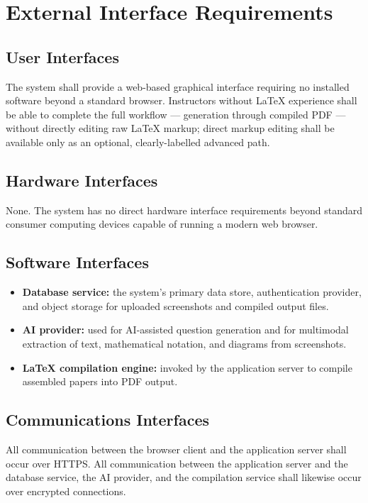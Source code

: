\documentclass[11pt]{article}
\begin{document}
\section{External Interface Requirements}

\subsection{User Interfaces}
The system shall provide a web-based graphical interface requiring no
installed software beyond a standard browser. Instructors without LaTeX
experience shall be able to complete the full workflow --- generation
through compiled PDF --- without directly editing raw LaTeX markup; direct
markup editing shall be available only as an optional, clearly-labelled
advanced path.

\subsection{Hardware Interfaces}
None. The system has no direct hardware interface requirements beyond
standard consumer computing devices capable of running a modern web
browser.

\subsection{Software Interfaces}
\begin{itemize}[nosep]
  \item \textbf{Database service:} the system's primary data store,
    authentication provider, and object storage for uploaded screenshots
    and compiled output files.
  \item \textbf{AI provider:} used for AI-assisted question generation and
    for multimodal extraction of text, mathematical notation, and diagrams
    from screenshots.
  \item \textbf{LaTeX compilation engine:} invoked by the application
    server to compile assembled papers into PDF output.
\end{itemize}

\subsection{Communications Interfaces}
All communication between the browser client and the application server
shall occur over HTTPS. All communication between the application server
and the database service, the AI provider, and the compilation service
shall likewise occur over encrypted connections.
\end{document}
